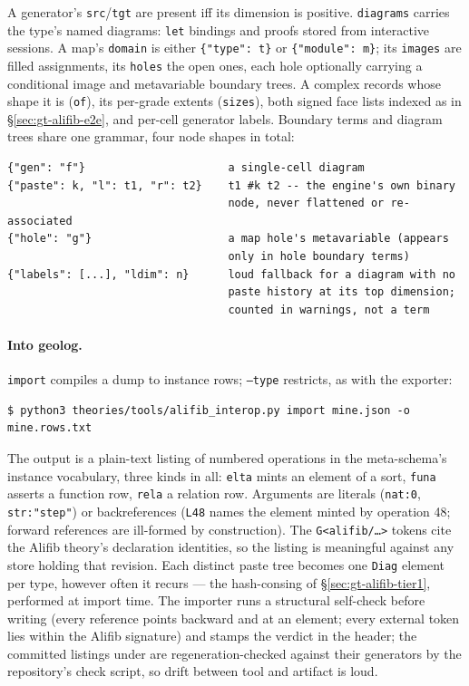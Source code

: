 \noindent A generator's \texttt{src}/\texttt{tgt} are present iff its
dimension is positive. \texttt{diagrams} carries the type's named
diagrams: \texttt{let} bindings and proofs stored from interactive
sessions. A map's \texttt{domain} is either
\texttt{\{"type":\ t\}} or \texttt{\{"module":\ m\}}; its
\texttt{images} are filled assignments, its \texttt{holes} the open
ones, each hole optionally carrying a conditional image and
metavariable boundary trees. A complex records whose shape it is
(\texttt{of}), its per-grade extents (\texttt{sizes}), both signed
face lists indexed as in \S\ref{sec:gt-alifib-e2e}, and per-cell
generator labels. Boundary terms and diagram trees share one grammar,
four node shapes in total:

\begin{Verbatim}[fontsize=\small,frame=leftline,rulecolor=\color{accentmid},framesep=3mm,xleftmargin=3mm]
{"gen": "f"}                      a single-cell diagram
{"paste": k, "l": t1, "r": t2}    t1 #k t2 -- the engine's own binary
                                  node, never flattened or re-associated
{"hole": "g"}                     a map hole's metavariable (appears
                                  only in hole boundary terms)
{"labels": [...], "ldim": n}      loud fallback for a diagram with no
                                  paste history at its top dimension;
                                  counted in warnings, not a term
\end{Verbatim}

\paragraph{Into geolog.} \texttt{import} compiles a dump to instance
rows; \texttt{--type} restricts, as with the exporter:

\begin{Verbatim}[fontsize=\small,frame=leftline,rulecolor=\color{accentmid},framesep=3mm,xleftmargin=3mm]
$ python3 theories/tools/alifib_interop.py import mine.json -o mine.rows.txt
\end{Verbatim}

\noindent The output is a plain-text listing of numbered operations in
the meta-schema's instance vocabulary, three kinds in all:
\texttt{elta} mints an element of a sort, \texttt{funa} asserts a
function row, \texttt{rela} a relation row. Arguments are literals
(\texttt{nat:0}, \texttt{str:"step"}) or backreferences
(\texttt{L48} names the element minted by operation 48; forward
references are ill-formed by construction). The
\texttt{G<alifib/\ldots>} tokens cite the Alifib theory's declaration
identities, so the listing is meaningful against any store holding
that revision. Each distinct paste tree becomes one \texttt{Diag}
element per type, however often it recurs --- the hash-consing of
\S\ref{sec:gt-alifib-tier1}, performed at import time. The importer
runs a structural self-check before writing (every reference points
backward and at an element; every external token lies within the
Alifib signature) and stamps the verdict in the header; the committed
listings under
 are regeneration-checked against their
generators by the repository's check script, so drift between tool and
artifact is loud.

